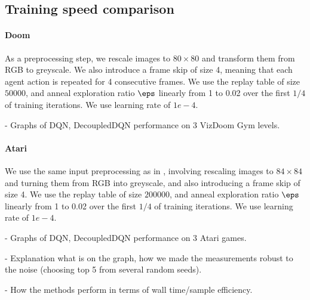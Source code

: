 \subsection{Training speed comparison}

\paragraph{Doom}
As a preprocessing step, we rescale images to $80 \times 80$ and transform them from RGB to greyscale.
We also introduce a frame skip of size 4, meaning that each agent action is repeated for 4 consecutive frames.
We use the replay table of size $50000$, and anneal exploration ratio $\eps$ linearly from 1 to 0.02
over the first $1/4$ of training iterations. We use learning rate of $1e-4$.

- Graphs of DQN, DecoupledDQN performance on 3 VizDoom Gym levels.

\paragraph{Atari}
We use the same input preprocessing as in \cite{mnih-dqn-2015}, involving rescaling images to $84
\times 84$ and turning them from RGB into greyscale, and also introducing a frame skip of size 4.
We use the replay table of size $200000$, and anneal exploration ratio $\eps$ linearly from 1 to 0.02
over the first $1/4$ of training iterations. We use learning rate of $1e-4$.

- Graphs of DQN, DecoupledDQN performance on 3 Atari games.

- Explanation what is on the graph, how we made the measurements robust to the noise (choosing top 5
from several random seeds).

- How the methods perform in terms of wall time/sample efficiency.
